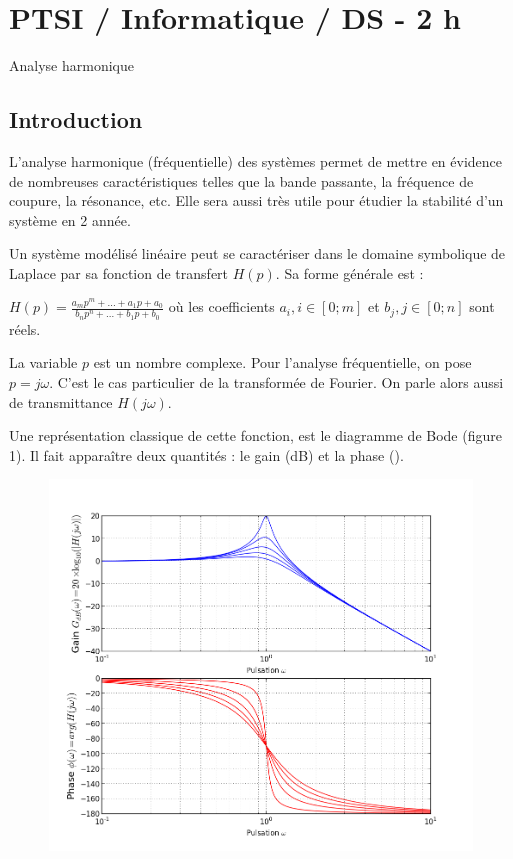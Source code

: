 \documentclass[11pt,fleqn]{book} %
\begin{document}
\chapter{PTSI / Informatique / DS  - 2 h}

\begin{center}
\huge{Analyse harmonique}
\end{center}

\section{Introduction}

L'analyse harmonique (fréquentielle) des systèmes permet de mettre en évidence de nombreuses caractéristiques telles que la bande passante, la fréquence de coupure, la résonance, etc.
Elle sera aussi très utile pour étudier la stabilité d'un système en 2 année.

Un système modélisé linéaire peut se caractériser dans le domaine symbolique de Laplace par sa fonction de transfert $H(p)$. Sa forme générale est :

$H(p) = \frac{{{a_m}{p^m} + ... + {a_1}p + {a_0}}}{{{b_n}{p^n} + ... + {b_1}p + {b_0}}}$ où les coefficients $a_i, i \in [0;m]$ et $b_j, j \in [0;n]$ sont réels.

La variable $p$ est un nombre complexe. Pour l'analyse fréquentielle, on pose $p=j \omega$. C'est le cas particulier de la transformée de Fourier. On parle alors aussi de transmittance $H(j \omega)$.

Une représentation classique de cette fonction, est le diagramme de Bode (figure 1). Il fait apparaître deux quantités : le gain (dB) et la phase (\degres).

\begin{figure}[!h]
\begin{center}
\includegraphics[scale=0.4]{figure_1.png} 
\end{center}
\end{figure}
\end{document}
